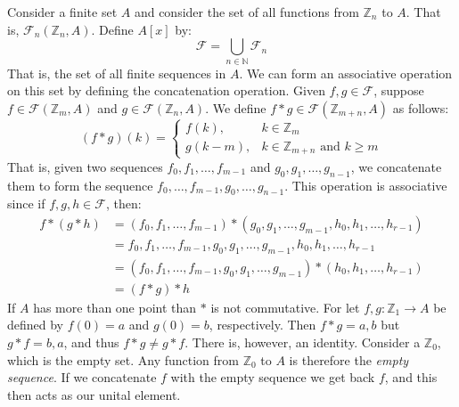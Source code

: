     \begin{example}
        Consider a finite set $A$ and consider the set of all functions from
        $\mathbb{Z}_{n}$ to $A$. That is, $\mathcal{F}_{n}(\mathbb{Z}_{n},A)$.
        Define $A[x]$ by:
        \begin{equation}
            \mathcal{F}=\bigcup_{n\in\mathbb{N}}\mathcal{F}_{n}
        \end{equation}
        That is, the set of all finite sequences in $A$. We can form an
        associative operation on this set by defining the concatenation
        operation. Given $f,g\in\mathcal{F}$, suppose
        $f\in\mathcal{F}(\mathbb{Z}_{m},A)$ and
        $g\in\mathcal{F}(\mathbb{Z}_{n},A)$. We define
        $f*g\in\mathcal{F}(\mathbb{Z}_{m+n},A)$ as follows:
        \begin{equation}
            (f*g)(k)=
            \begin{cases}
                f(k),&k\in\mathbb{Z}_{m}\\
                g(k-m),&k\in\mathbb{Z}_{m+n}\textrm{ and }k\geq{m}
            \end{cases}
        \end{equation}
        That is, given two sequences $f_{0},f_{1},\dots,f_{m-1}$ and
        $g_{0},g_{1},\dots,g_{n-1}$, we concatenate them to form the sequence
        $f_{0},\dots,f_{m-1},g_{0},\dots,g_{n-1}$. This operation is associative
        since if $f,g,h\in\mathcal{F}$, then:
        \begin{subequations}
            \begin{align}
                f*(g*h)&=(f_{0},f_{1},\dots,f_{m-1})
                    *(g_{0},g_{1},\dots,g_{m-1},h_{0},h_{1},\dots,h_{r-1})\\
                &=f_{0},f_{1},\dots,f_{m-1},
                    g_{0},g_{1},\dots,g_{m-1},h_{0},h_{1},\dots,h_{r-1}\\
                &=(f_{0},f_{1},\dots,f_{m-1},
                    g_{0},g_{1},\dots,g_{m-1})*(h_{0},h_{1},\dots,h_{r-1})\\
                &=(f*g)*h
            \end{align}
        \end{subequations}
        If $A$ has more than one point than $*$ is not commutative. For let
        $f,g:\mathbb{Z}_{1}\rightarrow{A}$ be defined by $f(0)=a$ and $g(0)=b$,
        respectively. Then $f*g=a,b$ but $g*f=b,a$, and thus $f*g\ne{g}*f$.
        There is, however, an identity. Consider a $\mathbb{Z}_{0}$, which is
        the empty set. Any function from $\mathbb{Z}_{0}$ to $A$ is therefore
        the \textit{empty sequence}. If we concatenate $f$ with the empty
        sequence we get back $f$, and this then acts as our unital element.
    \end{example}

